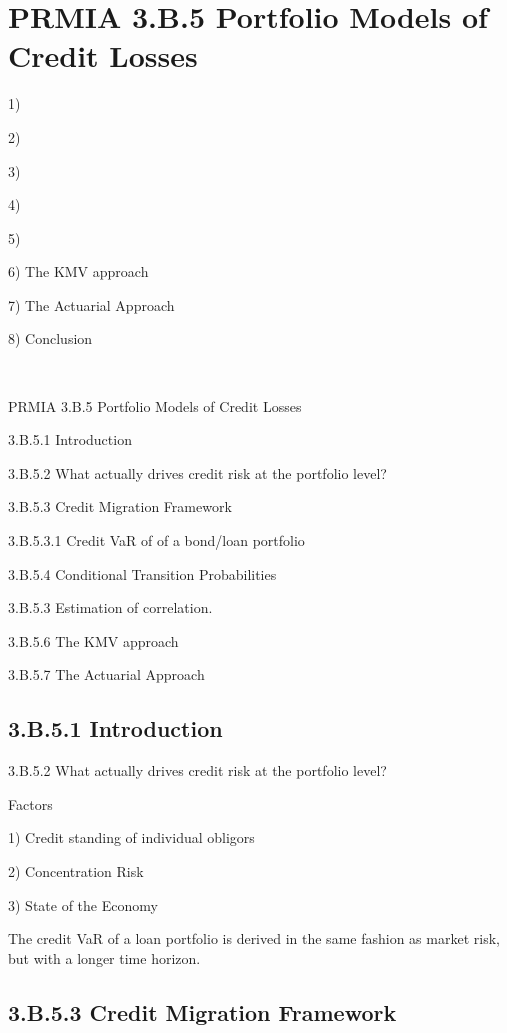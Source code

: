 
\section{PRMIA 3.B.5 Portfolio Models of Credit Losses}

1)

2)

3) 

4) 

5)  

6) The KMV approach

7) The Actuarial Approach

8) Conclusion

 

PRMIA 3.B.5 Portfolio Models of Credit Losses

3.B.5.1 Introduction

3.B.5.2 What actually drives credit risk at the portfolio level?

3.B.5.3 Credit Migration Framework

3.B.5.3.1 Credit VaR of of a bond/loan portfolio

3.B.5.4 Conditional Transition Probabilities

3.B.5.3 Estimation of correlation.

3.B.5.6 The KMV approach

3.B.5.7 The Actuarial Approach


\subsection{3.B.5.1 Introduction }


3.B.5.2 What actually drives credit risk at the portfolio level?

Factors

1) Credit standing of individual obligors

2) Concentration Risk

3) State of the Economy


The credit VaR of a loan portfolio is derived in the same fashion as market risk, but with a longer time horizon.


\subsection{3.B.5.3 Credit Migration Framework }

